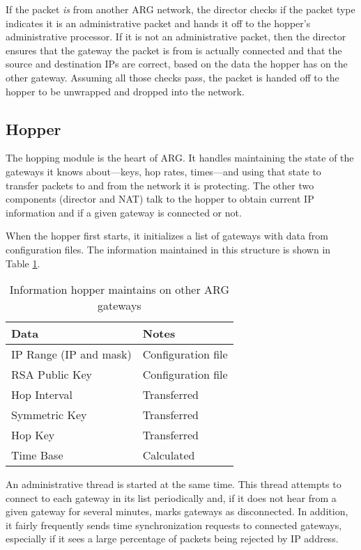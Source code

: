 \par If the packet \textit{is} from another ARG network, the director checks if the packet type indicates it is an administrative packet and hands it off to the hopper's administrative processor. If it is not an administrative packet, then the director ensures that the gateway the packet is from is actually connected and that the source and destination IPs are correct, based on the data the hopper has on the other gateway. Assuming all those checks pass, the packet is handed off to the hopper to be unwrapped and dropped into the network.

\subsection{Hopper}
\label{sec:arg_hopper}
\par The hopping module is the heart of ARG. It handles maintaining the state of the gateways it knows about---keys, hop rates, times---and using that state to transfer packets to and from the network it is protecting. The other two components (director and \ac{NAT}) talk to the hopper to obtain current IP information and if a given gateway is connected or not. 

\par When the hopper first starts, it initializes a list of gateways with data from configuration files. The information maintained in this structure is shown in Table \ref{tab:gatestate}. 

\begin{table}
\caption{Information hopper maintains on other ARG gateways}
\label{tab:gatestate}
\centering
\begin{tabular}{l|l}
	Data & Notes \\
	\hline
	IP Range (IP and mask) & Configuration file \\
	\ac{RSA} Public Key & Configuration file \\
	Hop Interval & Transferred \\
	Symmetric Key & Transferred \\
	Hop Key & Transferred \\
	Time Base & Calculated \\
\end{tabular}
\end{table}

\par An administrative thread is started at the same time. This thread attempts to connect to each gateway in its list periodically and, if it does not hear from a given gateway for several minutes, marks gateways as disconnected. In addition, it fairly frequently sends time synchronization requests to connected gateways, especially if it sees a large percentage of packets being rejected by \ac{IP} address. 

